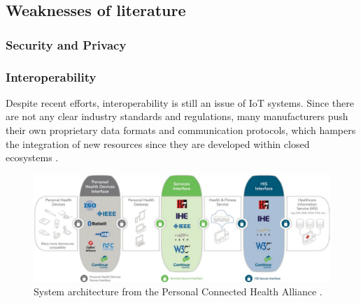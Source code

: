 \subsection{Weaknesses of literature}

\subsubsection{Security and Privacy}


\subsubsection{Interoperability}


Despite recent efforts, interoperability is still an issue of IoT systems. Since there are not any clear industry standards and regulations, many manufacturers push their own proprietary data formats and communication protocols, which hampers the integration of new resources since they are developed within closed ecosystems \cite{Rubi2019}. 




\begin{figure}[H]
    \centering
    \includegraphics[width=.90\linewidth]{images/cdg-architecutre.png}
    \caption{System architecture from the Personal Connected Health Alliance \cite{ContinuaHealthAlliance}.}
    \label{fig:continua-architecture}
\end{figure}

